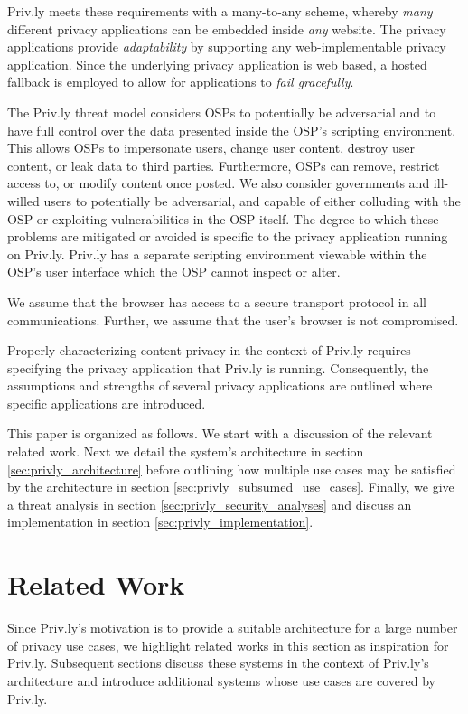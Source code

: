 \documentclass[letterpaper,twocolumn,10pt]{article}
\begin{document}
Priv.ly meets these requirements with a many-to-any
scheme, whereby \emph{many} different privacy applications can be embedded inside
\emph{any} website. The privacy applications provide \emph{adaptability} by supporting any web-implementable privacy application. 
Since the underlying privacy application is web based, a hosted fallback is employed to allow
for applications to \emph{fail gracefully}.
  
The Priv.ly threat model considers OSPs to potentially be adversarial and to have full control over the data presented inside the OSP's scripting environment. 
This allows OSPs to impersonate users, change user content, destroy user content, or leak data to 
third parties. Furthermore, OSPs can remove, restrict access to, or modify content 
once posted. We also consider governments and ill-willed users to potentially be 
adversarial, and capable of either colluding with the OSP or exploiting 
vulnerabilities in the OSP itself. The degree to which these problems are
mitigated or avoided is specific to the privacy application running on Priv.ly.
Priv.ly has a separate scripting environment viewable within the OSP's user 
interface which the OSP cannot inspect or alter.

We assume that the browser has access to a secure transport protocol in all 
communications. Further, we assume that the user's browser is not compromised.

Properly characterizing content privacy in the context of Priv.ly requires
specifying the privacy application that Priv.ly is running. Consequently, the
assumptions and strengths of several privacy applications are outlined
where specific applications are introduced.

This paper is organized as follows. We start with a discussion of the relevant related work. Next we detail the system's architecture in section
\ref{sec:privly_architecture} before outlining how multiple use cases may be 
satisfied by the architecture in section \ref{sec:privly_subsumed_use_cases}. Finally, we 
give a threat analysis in section \ref{sec:privly_security_analyses} and discuss an 
implementation in section \ref{sec:privly_implementation}.




\section{Related Work} \label{sec:related_work}

Since Priv.ly's motivation is to provide a suitable architecture for a large number of
privacy use cases, we highlight related works in this section as inspiration for Priv.ly.
Subsequent sections discuss these systems in the context of Priv.ly's architecture and 
introduce additional systems whose use cases are covered by Priv.ly.
\end{document}
